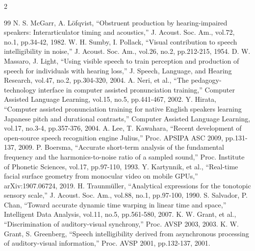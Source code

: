 \begin{multicols*}{2}
\begin{thebibliography}{99}
 N. S. McGarr, A. L{\"o}fqvist, ``Obstruent production by hearing-impaired speakers: Interarticulator timing and acoustics,'' J. Acoust. Soc. Am., vol.72, no.1, pp.34-42, 1982.
 W. H. Sumby, I. Pollack, ``Visual contribution to speech intelligibility in noise,'' J. Acoust. Soc. Am., vol.26, no.2, pp.212-215, 1954.
 D. W. Massaro, J. Light, ``Using visible speech to train perception and production of speech for individuals with hearing loss,'' J. Speech, Language, and Hearing Research, vol.47, no.2, pp.304-320, 2004.
 A. Neri, et al., ``The pedagogy-technology interface in computer assisted pronunciation training,'' Computer Assisted Language Learning, vol.15, no.5, pp.441-467, 2002.
 Y. Hirata, ``Computer assisted pronunciation training for native English speakers learning Japanese pitch and durational contrasts,'' Computer Assisted Language Learning, vol.17, no.3-4, pp.357-376, 2004.
 A. Lee, T. Kawahara, ``Recent development of open-source speech recognition engine Julius,'' Proc. APSIPA ASC 2009, pp.131-137, 2009.
 P. Boersma, ``Accurate short-term analysis of the fundamental frequency and the harmonics-to-noise ratio of a sampled sound,'' Proc. Institute of Phonetic Sciences, vol.17, pp.97-110, 1993.
 Y. Kartynnik, et al., ``Real-time facial surface geometry from monocular video on mobile GPUs,'' arXiv:1907.06724, 2019.
 H. Traunm{\"u}ller, ``Analytical expressions for the tonotopic sensory scale,'' J. Acoust. Soc. Am., vol.88, no.1, pp.97-100, 1990.
 S. Salvador, P. Chan, ``Toward accurate dynamic time warping in linear time and space,'' Intelligent Data Analysis, vol.11, no.5, pp.561-580, 2007.
 K. W. Grant, et al., ``Discrimination of auditory-visual synchrony,'' Proc. AVSP 2003, 2003.
 K. W. Grant, S. Greenberg, ``Speech intelligibility derived from asynchronous processing of auditory-visual information,'' Proc. AVSP 2001, pp.132-137, 2001.
\end{thebibliography}

\end{multicols*}

